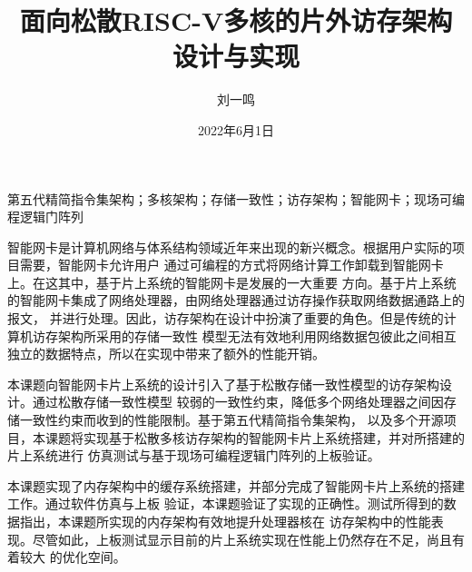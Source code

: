 \documentclass[supercite,notofont]{HustGraduPaper}
\title{面向松散RISC-V多核的片外访存架构设计与实现}
\author{刘一鸣}
\date{2022年6月1日}
\begin{document}
\maketitle

\statement

\clearpage


\begin{cnabstract}{第五代精简指令集架构；多核架构；存储一致性；访存架构；智能网卡；现场可编程逻辑门阵列}

智能网卡是计算机网络与体系结构领域近年来出现的新兴概念。根据用户实际的项目需要，智能网卡允许用户
通过可编程的方式将网络计算工作卸载到智能网卡上。在这其中，基于片上系统的智能网卡是发展的一大重要
方向。基于片上系统的智能网卡集成了网络处理器，由网络处理器通过访存操作获取网络数据通路上的报文，
并进行处理。因此，访存架构在设计中扮演了重要的角色。但是传统的计算机访存架构所采用的存储一致性
模型无法有效地利用网络数据包彼此之间相互独立的数据特点，所以在实现中带来了额外的性能开销。

本课题向智能网卡片上系统的设计引入了基于松散存储一致性模型的访存架构设计。通过松散存储一致性模型
较弱的一致性约束，降低多个网络处理器之间因存储一致性约束而收到的性能限制。基于第五代精简指令集架构，
以及多个开源项目，本课题将实现基于松散多核访存架构的智能网卡片上系统搭建，并对所搭建的片上系统进行
仿真测试与基于现场可编程逻辑门阵列的上板验证。

本课题实现了内存架构中的缓存系统搭建，并部分完成了智能网卡片上系统的搭建工作。通过软件仿真与上板
验证，本课题验证了实现的正确性。测试所得到的数据指出，本课题所实现的内存架构有效地提升处理器核在
访存架构中的性能表现。尽管如此，上板测试显示目前的片上系统实现在性能上仍然存在不足，尚且有着较大
的优化空间。

\end{cnabstract}
\end{document}
